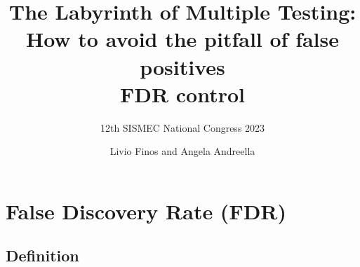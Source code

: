 \documentclass[xcolor={dvipsnames}]{beamer}
\title[]{The Labyrinth of Multiple Testing: How to avoid the pitfall of false positives \\
\vspace*{1cm} \large FDR control}
\subtitle{\vspace*{2cm} \small 12th SISMEC National Congress 2023}
\date{}
\author[\hspace{5cm}]{Livio Finos and Angela Andreella}
\begin{document}
\begin{frame}
  \titlepage
\end{frame}


\section{False Discovery Rate (FDR)}
\subsection{Definition}
\end{document}
